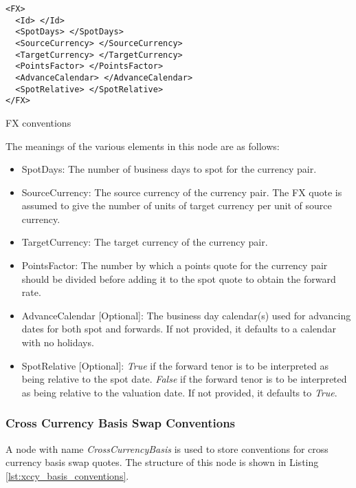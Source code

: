 \begin{listing}[H]
\begin{verbatim}
<FX>
  <Id> </Id>
  <SpotDays> </SpotDays>
  <SourceCurrency> </SourceCurrency>
  <TargetCurrency> </TargetCurrency>
  <PointsFactor> </PointsFactor>
  <AdvanceCalendar> </AdvanceCalendar>
  <SpotRelative> </SpotRelative>
</FX>
\end{verbatim}
\caption{FX conventions}
\label{lst:fx_conventions}
\end{listing}


The meanings of the various elements in this node are as follows:
\begin{itemize}
\item SpotDays: The number of business days to spot for the currency pair.
\item SourceCurrency: The source currency of the currency pair. The FX quote is assumed to give the number of units of
target currency per unit of source currency.
\item TargetCurrency: The target currency of the currency pair.
\item PointsFactor: The number by which a points quote for the currency pair should be divided before adding it to the
spot quote to obtain the forward rate.
\item AdvanceCalendar [Optional]: The business day calendar(s) used for advancing dates for both spot and forwards. If
not provided, it defaults to a calendar with no holidays.
\item SpotRelative [Optional]: \emph{True} if the forward tenor is to be interpreted as being relative to the spot date.
\emph{False} if the forward tenor is to be interpreted as being relative to the valuation date. If not provided, it
defaults to \emph{True}.
\end{itemize}

\subsubsection{Cross Currency Basis Swap Conventions}
A node with name \emph{CrossCurrencyBasis} is used to store conventions for cross currency basis swap quotes. The
structure of this node is shown in Listing \ref{lst:xccy_basis_conventions}.

